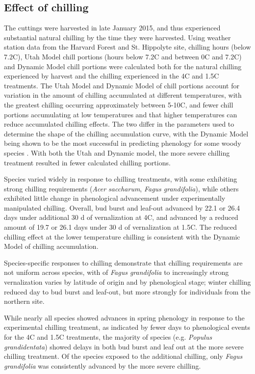 \documentclass[11pt]{article}
\begin{document}
\subsection*{Effect of chilling}
The cuttings were harvested in late January 2015, and thus experienced substantial natural chilling by the time they were harvested. Using weather station data from the Harvard Forest and St. Hippolyte site, chilling hours (below 7.2\degree C), Utah Model chill portions (hours below 7.2\degree C and between 0\degree C and 7.2\degree C) and Dynamic Model \cite{Erez:1988} chill portions were calculated both for the natural chilling experienced by harvest and the chilling experienced in the 4\degree C and 1.5\degree C treatments. The Utah Model and Dynamic Model of chill portions account for variation in the amount of chilling accumulated at different temperatures, with the greatest chilling occurring approximately between 5-10\degree C, and fewer chill portions accumulating at low temperatures and that higher temperatures can reduce accumulated chilling effects. The two differ in the parameters used to determine the shape of the chilling accumulation curve, with the Dynamic Model being shown to be the most successful in predicting phenology for some woody species \cite{Luedeling:2009}.
With both the Utah and Dynamic model, the more severe chilling treatment resulted in fewer calculated chilling portions. 

Species varied widely in response to chilling treatments, with some exhibiting strong chilling requirements (\emph{Acer saccharum}, \emph{Fagus grandifolia}), while others exhibited little change in phenological advancement under experimentally manipulated chilling. Overall, bud burst and leaf-out advanced by 22.1 or 26.4 days under additional 30 d of vernalization at 4\degree C, and advanced by a reduced amount of 19.7 or 26.1 days under 30 d of vernalization at 1.5\degree C. The reduced chilling effect at the lower temperature chilling is consistent with the Dynamic Model of chilling accumulation. %

Species-specific responses to chilling demonstrate that chilling requirements are not uniform across species, with 
of \emph{Fagus grandifolia} to increasingly strong vernalization varies by latitude of origin and by phenological stage; winter chilling reduced day to bud burst and leaf-out, but more strongly for individuals from the northern site.

While nearly all species showed advances in spring phenology in response to the experimental chilling treatment, as indicated by fewer days to phenological events for the 4\degree C and 1.5\degree C treatments, the majority of species (e.g. \emph{Populus grandidentata}) showed delays in both bud burst and leaf out at the more severe chilling treatment. Of the species exposed to the additional chilling, only \emph{Fagus grandifolia} was consistently advanced by the more severe chilling.
\end{document}
